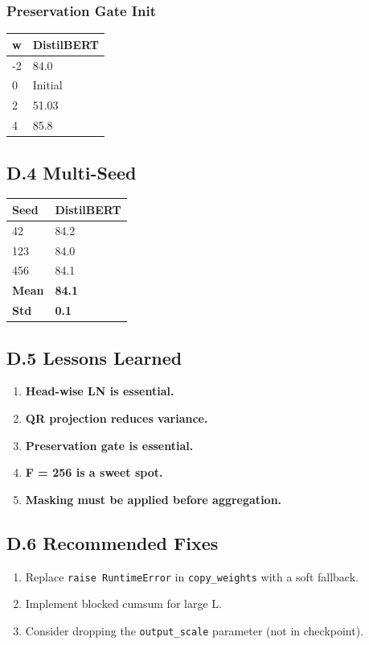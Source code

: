 \subsubsection{Preservation Gate Init}

\begin{table}[H]
\centering
\small
\begin{tabular}{ll}
\toprule
\textbf{w} & \textbf{DistilBERT} \\
\midrule
-2 & 84.0 \\
0 & Initial \\
2 & 51.03 \\
4 & 85.8 \\
\bottomrule
\end{tabular}
\end{table}

\subsection{D.4 Multi-Seed}

\begin{table}[H]
\centering
\small
\begin{tabular}{ll}
\toprule
\textbf{Seed} & \textbf{DistilBERT} \\
\midrule
42 & 84.2 \\
123 & 84.0 \\
456 & 84.1 \\
\textbf{Mean} & \textbf{84.1} \\
\textbf{Std} & \textbf{0.1} \\
\bottomrule
\end{tabular}
\end{table}

\subsection{D.5 Lessons Learned}

\begin{enumerate}
\item \textbf{Head-wise LN is essential.}
\item \textbf{QR projection reduces variance.}
\item \textbf{Preservation gate is essential.}
\item \textbf{F = 256 is a sweet spot.}
\item \textbf{Masking must be applied before aggregation.}

\end{enumerate}
\subsection{D.6 Recommended Fixes}

\begin{enumerate}
\item Replace \texttt{raise RuntimeError} in \texttt{copy\_weights} with a soft fallback.
\item Implement blocked cumsum for large L.
\item Consider dropping the \texttt{output\_scale} parameter (not in checkpoint).

\end{enumerate}
